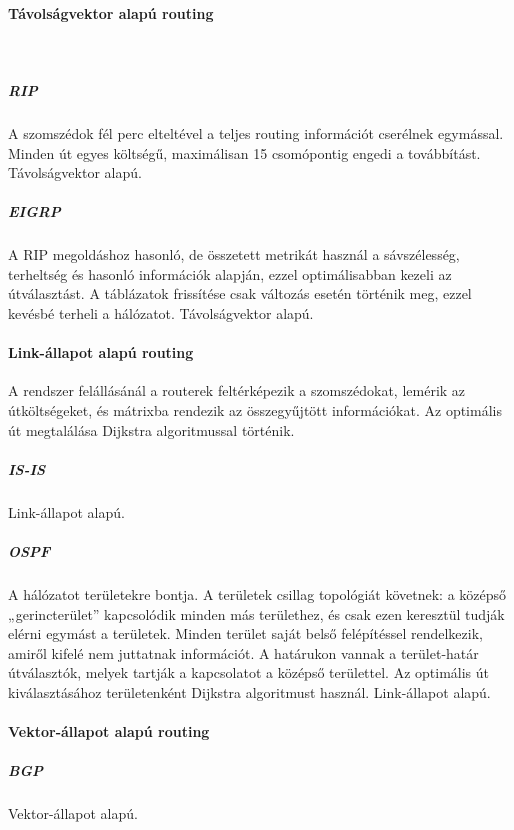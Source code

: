 \paragraph{Távolságvektor alapú routing}~

\subparagraph{RIP} A szomszédok fél perc elteltével a teljes routing információt cserélnek egymással. Minden út egyes költségű, maximálisan 15 csomópontig engedi a továbbítást. Távolságvektor alapú.

\subparagraph{EIGRP} A RIP megoldáshoz hasonló, de összetett metrikát használ a sávszélesség, terheltség és hasonló információk alapján, ezzel optimálisabban kezeli az útválasztást. A táblázatok frissítése csak változás esetén történik meg, ezzel kevésbé terheli a hálózatot. Távolságvektor alapú.

\paragraph{Link-állapot alapú routing} A rendszer felállásánál a routerek feltérképezik a szomszédokat, lemérik az útköltségeket, és mátrixba rendezik az összegyűjtött információkat. Az optimális út megtalálása Dijkstra algoritmussal történik.

\subparagraph{IS-IS} Link-állapot alapú.

\subparagraph{OSPF} A hálózatot területekre bontja. A területek csillag topológiát követnek: a középső „gerincterület” kapcsolódik minden más területhez, és csak ezen keresztül tudják elérni egymást a területek. Minden terület saját belső felépítéssel rendelkezik, amiről kifelé nem juttatnak információt. A határukon vannak a terület-határ útválasztók, melyek tartják a kapcsolatot a középső területtel. Az optimális út kiválasztásához területenként Dijkstra algoritmust használ. Link-állapot alapú.

\paragraph{Vektor-állapot alapú routing}

\subparagraph{BGP} Vektor-állapot alapú.


